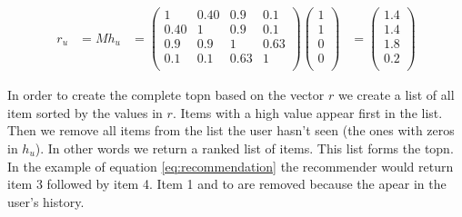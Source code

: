 \begin{align}
  \label{eq:recommendation}
r_u &= M h_u 
&=
\begin{pmatrix}
  1  & 0.40 & 0.9 & 0.1 \\
 0.40 &1  & 0.9 & 0.1 \\
  0.9 & 0.9 &1  & 0.63 \\
  0.1 & 0.1 & 0.63 &1 \\  
\end{pmatrix} 
\begin{pmatrix}
 1 \\
 1 \\
 0 \\
 0 \\
\end{pmatrix}
&= 
\begin{pmatrix}
 1.4 \\
 1.4 \\
 1.8 \\
 0.2 \\
\end{pmatrix}
\end{align}

In order to create the complete \gls{topn} based on the vector $r$ we create a list of all item sorted by the values in $r$. Items with a high value appear first in the list. Then we remove all items from the list the user hasn't seen (the ones with zeros in $h_u$). In other words we return a ranked list of items. This list forms the \gls{topn}. In the example of equation \ref{eq:recommendation} the recommender would return item 3 followed by item 4. Item 1 and to are removed because the apear in the user's history.

